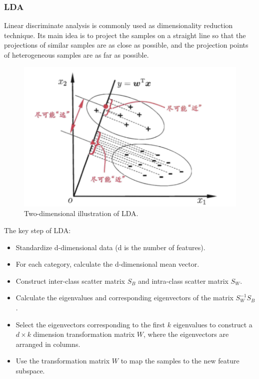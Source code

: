 \documentclass{article}
\begin{document}
\subsubsection{LDA}
\indent Linear discriminate analysis is commonly used as dimensionality reduction technique. Its main idea is to project the samples on a straight line so that the projections of similar samples are as close as possible, and the projection points of heterogeneous samples are as far as possible. 
	\begin{figure}[htbp]
		\centering
		\includegraphics[scale=0.3]{figure/LDA.png}
		\caption{Two-dimensional illustration of LDA.}
		\label{fig:LDA}
	\end{figure}\cite{zhihuazhou2016ml}\par
\indent The key step of LDA:
\begin{itemize}
		\item Standardize d-dimensional data (d is the number of features).
		
		\item For each category, calculate the d-dimensional mean vector.
		
		\item Construct inter-class scatter matrix $S_B$ and intra-class scatter matrix $S_W$.
		
		\item Calculate the eigenvalues and corresponding eigenvectors of the matrix $S^{-1}_WS_B$.
		
		\item Select the eigenvectors corresponding to the first $k$ eigenvalues to construct a $d \times k$ dimension transformation matrix $W$, where the eigenvectors are arranged in columns.
		
		\item Use the transformation matrix $W$ to map the samples to the new feature subspace.
		
\end{itemize}
\end{document}
